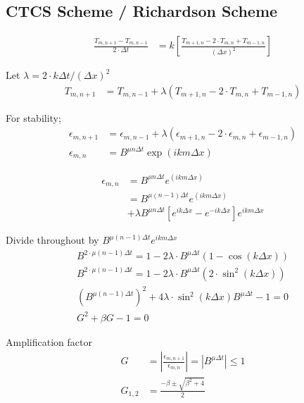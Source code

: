 \documentclass[fleqn,10pt]{SelfArx} %
\begin{document}
\subsection{CTCS Scheme / Richardson Scheme}
\begin{align*}
	\frac{T_{m,n+1} - T_{m,n-1}}{2\cdot\Delta t} &= k\left[\frac{T_{m+1,n} - 2\cdot T_{m,n} + T_{m-1,n}}{(\Delta x)^2}\right] \tag{12.9} \label{eq:ctcs}
\end{align*}

Let $\lambda = 2\cdot k\Delta t/(\Delta x)^2$
\begin{align*}
	T_{m,n+1} &= T_{m,n-1} + \lambda(T_{m+1,n} - 2\cdot T_{m,n} + T_{m-1,n}) \tag{12.10} \label{12.10}
\end{align*}

For stability;
\begin{align*}
	\epsilon_{m,n+1} &= \epsilon_{m,n-1} + \lambda(\epsilon_{m+1,n}-2\cdot\epsilon_{m,n} + \epsilon_{m-1,n}) \tag{12.11} \label{eq:12.11} \\
	\epsilon_{m,n} &= B^{\mu n\Delta t}\exp(ikm\Delta x) \tag{12.12} \label{eq:12.12}
\end{align*}

\begin{align*}
	\epsilon_{m,n} &= B^{\mu n\Delta t}e^{(ikm\Delta x)} \\
		       &= B^{\mu (n-1)\Delta t}e^{(ikm\Delta x)} \\ &+ \lambda B^{\mu n \Delta t}\left[e^{ik\Delta x} - e^{-ik\Delta x}\right]e^{ikm\Delta x}
\end{align*}

Divide throughout by $B^{\mu(n-1)\Delta t} e^{ikm\Delta x}$
\begin{align*}
	B^{2\cdot\mu(n-1)\Delta t} = 1 -2\lambda \cdot B^{\mu \Delta t}\left(1-\cos(k\Delta x)\right) \\
	B^{2\cdot\mu(n-1)\Delta t} = 1 -2\lambda \cdot B^{\mu \Delta t}\left(2\cdot\sin^2(k\Delta x)\right) \\
	\left(B^{\mu(n-1)\Delta t}\right)^2 + 4\lambda \cdot \sin^2(k\Delta x)B^{\mu \Delta t} - 1 = 0 \\
	G^2 + \beta G -1 = 0 \tag{12.13} \label{eq:12.13}
\end{align*}

Amplification factor
\begin{align*}
	G &= \left|\frac{\epsilon_{m,n+1}}{\epsilon_{m,n}}\right| = \left|B^{\mu \Delta t}\right| \leq 1 \tag{12.14} \label{eq:12.14} \\
	G_{1,2} &= \frac{-\beta \pm \sqrt{\beta^2 + 4}}{2} \tag{12.15} \label{eq:12.15}
\end{align*}
\end{document}

